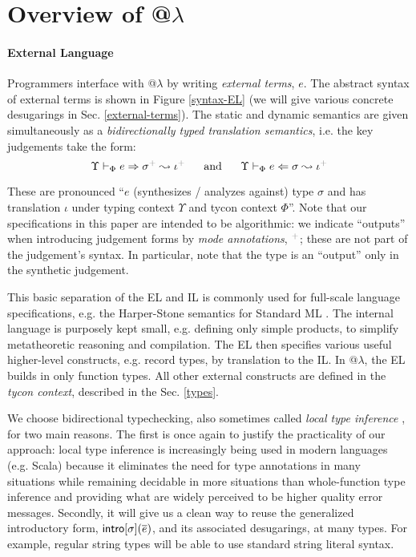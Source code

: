 \documentclass[10pt,preprint]{sigplanconf}
\newcommand{\moutput}{^{\color{gray}+}}
\begin{document}
\section{Overview of @$\lambda$}\label{atlam}\label{overview}
\paragraph{External Language}
Programmers interface with @$\lambda$ by writing \emph{external terms}, $e$. The abstract syntax of external terms is shown in Figure \ref{syntax-EL} (we will give various concrete desugarings in Sec. \ref{external-terms}). %
The static and dynamic semantics are given simultaneously as a \emph{bidirectionally typed translation semantics}, i.e. the key judgements take the form:  \[\esynX{e}{\st\moutput}{\iota\moutput} ~~~~~\text{and}~~~~~ \eanaX{e}{\st}{\iota\moutput}\]
\noindent

These are pronounced ``$e$ (synthesizes / analyzes against) type $\sigma$ and has  translation $\iota$ under typing context $\Upsilon$ and tycon context $\Phi$''. Note that our specifications in this paper are intended to be algorithmic: we indicate ``outputs'' when introducing judgement forms by \emph{mode annotations}, $\moutput$; these are not part of the judgement's syntax. In particular, note that the type is an ``output'' only in the synthetic judgement.

This basic separation of the EL and IL is commonly used for full-scale language specifications, e.g. the Harper-Stone semantics for Standard ML \cite{Harper00atype-theoretic}. The internal language is purposely kept small, e.g. defining only simple products, to simplify metatheoretic reasoning and compilation. The EL then specifies various useful higher-level constructs, e.g. record types, by translation to the IL. In @$\lambda$, the EL builds in only function types. All other external constructs are defined in the \emph{tycon context}, described in the Sec. \ref{types}. 

We choose bidirectional typechecking, also sometimes called \emph{local type inference} \cite{Pierce:2000:LTI:345099.345100}, for two main reasons. The first is once again to justify the practicality of our approach: local type inference is increasingly being used in modern languages (e.g. Scala) because it eliminates the need for type annotations in many situations while remaining decidable in more situations than whole-function type inference and providing what are widely perceived to be higher quality error messages. Secondly, it will give us a clean way to reuse the generalized introductory form, ${\sf intro}[\sigma](\overline{e})$, and its associated desugarings, at many types. For example, regular string types will be able to use standard string literal syntax. 
\end{document}
